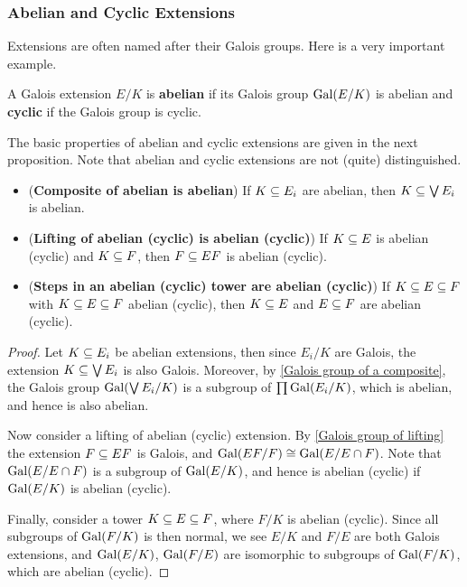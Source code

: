 \subsubsection{Abelian and Cyclic Extensions}
Extensions are often named after their Galois groups. Here is a very important example.
\begin{definition}
A Galois extension $E/K$ is \textbf{abelian} if its Galois group $\mathrm{Gal}(E/K)$ is abelian and \textbf{cyclic} if the Galois group is cyclic.
\end{definition}
The basic properties of abelian and cyclic extensions are given in the next proposition. Note that abelian and cyclic extensions are not (quite) distinguished.
\begin{proposition}\label{field ext abelian cyclic prop}
\mbox{}
\begin{itemize}
\item (\textbf{Composite of abelian is abelian}) If $K\subseteq E_i$ are abelian, then $K\subseteq\bigvee E_i$ is abelian.
\item (\textbf{Lifting of abelian (cyclic) is abelian (cyclic)}) If $K\subseteq E$ is abelian (cyclic) and $K\subseteq F$, then $F\subseteq EF$ is abelian (cyclic).
\item (\textbf{Steps in an abelian (cyclic) tower are abelian (cyclic)}) If $K\subseteq E\subseteq F$ with $K\subseteq E\subseteq F$ abelian (cyclic), then $K\subseteq E$ and $E\subseteq F$ are abelian (cyclic).
\end{itemize}
\end{proposition}
\begin{proof}
Let $K\subseteq E_i$ be abelian extensions, then since $E_i/K$ are Galois, the extension $K\subseteq\bigvee E_i$ is also Galois. Moreover, by \cref{Galois group of a composite}, the Galois group $\mathrm{Gal}(\bigvee E_i/K)$ is a subgroup of $\prod\mathrm{Gal}(E_i/K)$, which is abelian, and hence is also abelian.\par
Now consider a lifting of abelian (cyclic) extension. By \cref{Galois group of lifting} the extension $F\subseteq EF$ is Galois, and $\mathrm{Gal}(EF/F)\cong\mathrm{Gal}(E/E\cap F)$. Note that $\mathrm{Gal}(E/E\cap F)$ is a subgroup of $\mathrm{Gal}(E/K)$, and hence is abelian (cyclic) if $\mathrm{Gal}(E/K)$ is abelian (cyclic).\par
Finally, consider a tower $K\subseteq E\subseteq F$, where $F/K$ is abelian (cyclic). Since all subgroups of $\mathrm{Gal}(F/K)$ is then normal, we see $E/K$ and $F/E$ are both Galois extensions, and $\mathrm{Gal}(E/K)$, $\mathrm{Gal}(F/E)$ are isomorphic to subgroups of $\mathrm{Gal}(F/K)$, which are abelian (cyclic).
\end{proof}
